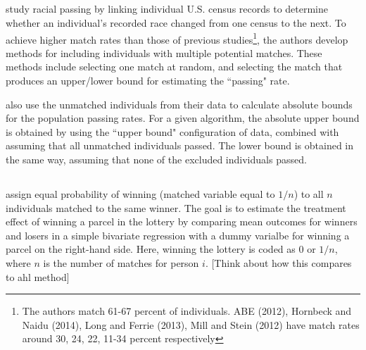 \documentclass[12pt]{article}
\begin{document}
\subsection{\cite{nq2015}}
\cite{nq2015} study racial passing by linking individual U.S. census records to determine whether an individual's recorded race changed from one census to the next.  To achieve higher match rates than those of previous studies\footnote{The authors match 61-67 percent of individuals.   ABE (2012), Hornbeck and Naidu (2014), Long and Ferrie (2013), Mill and Stein (2012)
have match rates around 30, 24, 22, 11-34 percent respectively}, the authors develop methods for including individuals with multiple potential matches.  These methods include selecting one match at random, and selecting the match that produces an upper/lower bound for estimating the ``passing" rate.  

\cite{nq2015} also use the unmatched individuals from their data to calculate absolute bounds for the population passing rates.  For a given algorithm, the absolute upper bound is obtained by using the ``upper bound" configuration of data, combined with assuming that all unmatched individuals passed.  The lower bound is obtained in the same way, assuming that none of the excluded individuals passed. 

\subsection{\cite{bleakley2016}}

\cite{bleakley2016} assign equal probability of winning (matched variable equal to $1/n$) to all $n$ individuals matched to the same winner.  The goal is to estimate the treatment effect of winning a parcel in the lottery by comparing mean outcomes for winners and losers in a simple bivariate regression with a dummy varialbe for winning a parcel on the right-hand side.   Here, winning the lottery is coded as $0$ or $1/n$, where $n$ is the number of matches for person $i$. [Think about how this compares to ahl method]
\end{document}

